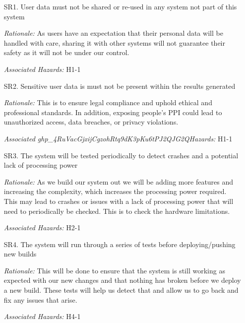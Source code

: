 \documentclass{article}
\begin{document}
\begin{enumerate}

    \item[SR1.] User data must not be shared or re-used in any system not part of this system\\
    \item[] \emph{Rationale:}  As users have an expectation that their personal data will be handled with care, sharing it with other systems will not guarantee their safety as it will not be under our control.\\
    \item[] \emph{Associated Hazards:} H1-1\\

    \item[SR2.] Sensitive user data is must not be present within the results generated\\
    \item[] \emph{Rationale:}  This is to ensure legal compliance and uphold ethical and professional standards. In addition, exposing people's PPI could lead to unauthorized access, data breaches, or privacy violations.\\
    \item[] \emph{Associated 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Hazards:} H1-1\\
    
    \item[SR3.] The system will be tested periodically to detect crashes and a potential lack of processing power\\
    \item[] \emph{Rationale:} As we build our system out we will be adding more features and increasing the complexity, which increases the processing power required. This may lead to crashes or issues with a lack of processing power that will need to periodically be checked. This is to check the hardware limitations. \\
    \item[] \emph{Associated Hazards:} H2-1\\

    \item[SR4.] The system will run through a series of tests before deploying/pushing new builds\\
    \item[] \emph{Rationale:} This will be done to ensure that the system is still working as expected with our new changes and that nothing has broken before we deploy a new build. These tests will help us detect that and allow us to go back and fix any issues that arise. \\
    \item[] \emph{Associated Hazards:} H4-1  \\


\end{enumerate}
\end{document}
